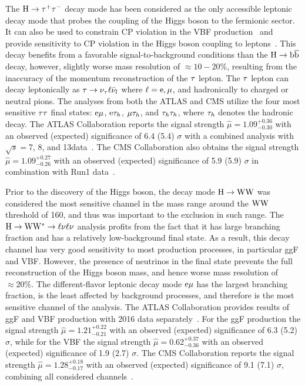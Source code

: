 The $\mathrm{H}\to\tau^{+}\tau^{-}$ decay mode has been considered as the only accessible leptonic decay mode that probes the coupling of the Higgs boson to the fermionic sector. It can also be used to constrain CP violation in the VBF production~\cite{Aad:2016nal} and provide sensitivity to CP violation in the Higgs boson coupling to leptons~\cite{Berge:2015nua}. This decay benefits from a favorable signal-to-background conditions than the $\mathrm{H}\to \mathrm{b}\overline{\mathrm{b}}$ decay, however, slightly worse mass resolution of $\approx 10 - 20\%$, resulting from the inaccuracy of the momentum reconstruction of the $\tau$ lepton. The $\tau$ lepton can decay leptonically as $\tau\to\nu_{\tau}\ell\bar{\nu}_{l}$ where $\ell=\mathrm{e}, \mu$, and hadronically to charged or neutral pions. The analyses from both the ATLAS and CMS utilize the four most sensitive $\tau\tau$ final states: $\mathrm{e}\mu$, $\mathrm{e}\tau_{h}$, $\mu\tau_{h}$, and $\tau_{h}\tau_{h}$, where $\tau_{h}$ denotes the hadronic decay. The ATLAS Collaboration reports the signal strength $\hat{\mu}=1.09^{+0.36}_{-0.30}$ with an observed (expected) significance of 6.4 (5.4) $\sigma$ with a combined analysis with $\sqrt{s}=$7, 8, and 13\TeV data~\cite{ATLAS-CONF-2018-021}. The CMS Collaboration also obtains the signal strength $\hat{\mu}=1.09^{+0.27}_{-0.26}$ with an observed (expected) significance of 5.9 (5.9) $\sigma$ in combination with Run1 data~\cite{Sirunyan:2017khh}.

Prior to the discovery of the Higgs boson, the decay mode $\mathrm{H}\to\mathrm{W}\mathrm{W}$ was considered the most sensitive channel in the mass range around the $\mathrm{W}\mathrm{W}$ threshold of 160\GeV, and thus was important to the exclusion in such range. The $\mathrm{H}\to\mathrm{W}\mathrm{W}^{*}\to\ell\nu\ell\nu$ analysis profits from the fact that it has large branching fraction and has a relatively low-background final state. As a result, this decay channel has very good sensitivity to most production processes, in particular ggF and VBF. However, the presence of neutrinos in the final state prevents the full reconstruction of the Higgs boson mass, and hence worse mass resolution of $\approx 20\%$. The different-flavor leptonic decay mode $\mathrm{e}\mu$ has the largest branching fraction, is the least affected by background processes, and therefore is the most sensitive channel of the analysis. The ATLAS Collaboration provides results of ggF and VBF production with 2016 data separately~\cite{ATLAS-CONF-2018-004}. For the ggF production the signal strength $\hat{\mu}=1.21^{+0.22}_{-0.21}$ with an observed (expected) significance of 6.3 (5.2) $\sigma$, while for the VBF the signal strength $\hat{\mu}=0.62^{+0.37}_{-0.36}$ with an observed (expected) significance of 1.9 (2.7) $\sigma$. The CMS Collaboration reports the signal strength $\hat{\mu}=1.28^{+0.18}_{-0.17}$ with an observed (expected) significance of 9.1 (7.1) $\sigma$, combining all considered channels~\cite{Sirunyan:2018egh}.


